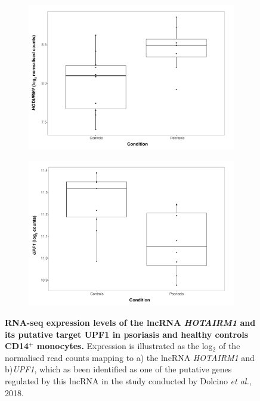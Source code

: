 \begin{figure}[htbp]
\centering
\begin{subfigure}{0.5\textwidth}
\centering
\includegraphics[width=\textwidth]{./Results2/pdfs/RNAseq_PS_CTL_lncRNA_HOTAIRM1_CD14}
\caption{\textbf{}}
\end{subfigure}
\begin{subfigure}{0.5\textwidth}
\centering
\includegraphics[width=\textwidth]{./Results2/pdfs/RNAseq_PS_CTL_lncRNA_UPF1_CD14}
\caption{\textbf{}}
\end{subfigure}
\caption[RNA-seq expression levels of the lncRNA \textit{HOTAIRM1} and its putative target UPF1 in psoriasis and healthy controls CD14$^+$ monocytes.]{\textbf{RNA-seq expression levels of the lncRNA \textit{HOTAIRM1} and its putative target UPF1 in psoriasis and healthy controls CD14$^+$ monocytes.} Expression is illustrated as the log$_2$ of the normalised read counts mapping to a) the lncRNA \textit{HOTAIRM1} and b)\textit{UPF1}, which as been identified as one of the putative genes regulated by this lncRNA in the study conducted by Dolcino \textit{et al.}, 2018.}
\label{figure:RNAseq_PS_CTL_CD14_expression_HOTAIRM_UPF1}
\end{figure} 


